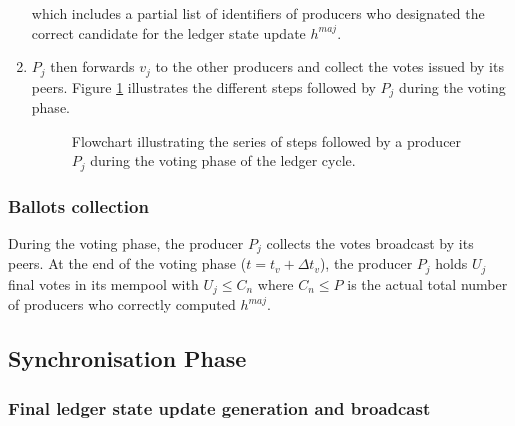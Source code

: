 \begin{enumerate}
which includes a partial list of identifiers of producers who designated the correct candidate for the ledger state update $h^{maj}$. 

\item $P_j$ then forwards $v_j$  to the other producers and collect the votes issued by its peers. Figure \ref{fig:Vot} illustrates the different steps followed by $P_j$ during the voting phase.
\begin{figure}[H]
\label{fig:Vot}
\caption{\label{fig:Vot}Flowchart illustrating the series of steps followed by a producer $P_j$ during the voting phase of the ledger cycle.}
\end{figure}
\end{enumerate}


\subsubsection{Ballots collection}
During the voting phase, the producer $P_j$  collects the votes broadcast by its peers. At the end of the voting phase ($t = t_v+\Delta t_{v}$), the producer $P_j$ holds $U_j$ final votes in its mempool with $U_j \leq C_n$ where $C_n \leq P$ is the actual total number of producers who correctly computed $h^{maj}$.  


\subsection{Synchronisation Phase}
\subsubsection{Final ledger state update generation and broadcast}


